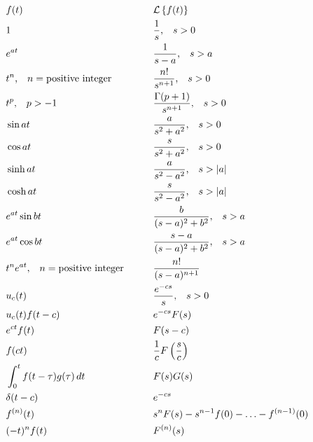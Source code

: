 \documentclass[10pt]{article}
\begin{document}
\begin{alignat*}{3}
    &f(t)&&\text{\quad}&&\mathcal{L}\left\{f(t)\right\}\\
    &1&&\text{\quad}&&\frac{1}{s}\text{,\quad}s>0\\
    &e^{at}&&\text{\quad}&&\frac{1}{s-a}\text{,\quad}s>a\\
    &t^n\text{,\quad}n=\text{positive integer}&&\text{\quad}&&\frac{n!}{s^{n+1}}\text{,\quad}s>0\\
    &t^p\text{,\quad}p>-1&&\text{\quad}&&\frac{\Gamma(p+1)}{s^{n+1}}\text{,\quad}s>0\\
    &\sin at&&\text{\quad}&&\frac{a}{s^2+a^2}\text{,\quad}s>0\\
    &\cos at&&\text{\quad}&&\frac{s}{s^2+a^2}\text{,\quad}s>0\\
    &\sinh at&&\text{\quad}&&\frac{a}{s^2-a^2}\text{,\quad}s>|a|\\
    &\cosh at&&\text{\quad}&&\frac{s}{s^2-a^2}\text{,\quad}s>|a|\\
    &e^{at} \sin bt&&\text{\quad}&&\frac{b}{(s-a)^2+b^2}\text{,\quad}s>a\\
    &e^{at} \cos bt&&\text{\quad}&&\frac{s-a}{(s-a)^2+b^2}\text{,\quad}s>a\\
    &t^n e^{at}\text{,\quad}n=\text{positive integer}&&\text{\quad}&&\frac{n!}{(s-a)^{n+1}}\\
    &u_c(t)&&\text{\quad}&&\frac{e^{-cs}}{s}\text{,\quad}s>0\\
    &u_c(t)f(t-c)&&\text{\quad}&&e^{-cs}F(s)\\
    &e^{ct}f(t)&&\text{\quad}&&F(s-c)\\
    &f(ct)&&\text{\quad}&&\frac{1}{c}F\left(\frac{s}{c}\right)\\
    &\int_0^t f(t-\tau)g(\tau)\,dt&&\text{\quad}&&F(s)G(s)\\
    &\delta(t-c)&&\text{\quad}&&e^{-cs}\\
    &f^{(n)}(t)&&\text{\quad}&&s^n F(s)-s^{n-1}f(0)-\ldots-f^{(n-1)}(0)\\
    &(-t)^n f(t)&&\text{\quad}&&F^{(n)}(s)
\end{alignat*}
\end{document}
